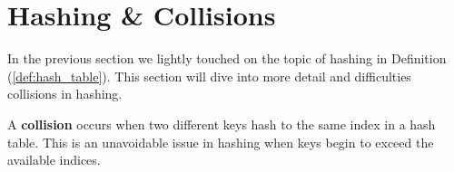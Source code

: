 \newpage 

\section{Hashing \& Collisions}

In the previous section we lightly touched on the topic of hashing in Definition (\ref{def:hash_table}). 
This section will dive into more detail and difficulties collisions in hashing.

\begin{Def}[Collisions]

    A \textbf{collision} occurs when two different keys hash to the same index in a hash table.
    This is an unavoidable issue in hashing when keys begin to exceed the available indices.
\end{Def}

